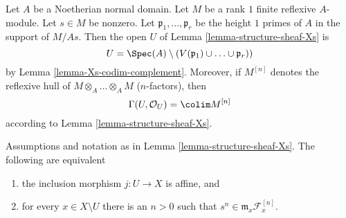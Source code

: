 \begin{remark}
\label{remark-structure-sheaf-Xs}
Let $A$ be a Noetherian normal domain. Let $M$ be a rank $1$ finite reflexive
$A$-module. Let $s \in M$ be nonzero. Let $\mathfrak p_1, \ldots, \mathfrak p_r$
be the height $1$ primes of $A$ in the support of $M/As$.
Then the open $U$ of Lemma \ref{lemma-structure-sheaf-Xs} is
$$
U = \Spec(A) \setminus
\left(V(\mathfrak p_1) \cup \ldots \cup \mathfrak p_r)\right)
$$
by Lemma \ref{lemma-Xs-codim-complement}. Moreover, if $M^{[n]}$
denotes the reflexive hull of $M \otimes_A \ldots \otimes_A M$
($n$-factors), then
$$
\Gamma(U, \mathcal{O}_U) = \colim M^{[n]}
$$
according to Lemma \ref{lemma-structure-sheaf-Xs}.
\end{remark}

\begin{lemma}
\label{lemma-affine-Xs}
Assumptions and notation as in Lemma \ref{lemma-structure-sheaf-Xs}.
The following are equivalent
\begin{enumerate}
\item the inclusion morphism $j : U \to X$ is affine, and
\item for every $x \in X \setminus U$ there is an $n > 0$
such that $s^n \in \mathfrak m_x \mathcal{F}^{[n]}_x$.
\end{enumerate}
\end{lemma}

